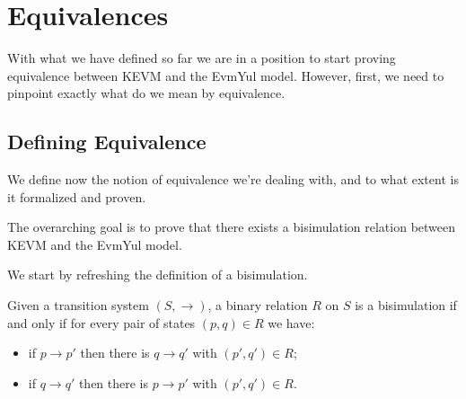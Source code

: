 \chapter{Equivalences}

With what we have defined so far we are in a position to start proving
equivalence between KEVM and the EvmYul model. However, first, we need to
pinpoint exactly what do we mean by equivalence.

\section{Defining Equivalence}

We define now the notion of equivalence we're dealing with, and to what extent
is it formalized and proven.

The overarching goal is to prove that there exists a bisimulation relation between
KEVM and the EvmYul model.

We start by refreshing the definition of a bisimulation.

\begin{definition}\label{def:bisimulation}
Given a transition system $(S, \rightarrow)$, a binary relation $R$ on $S$ is a
bisimulation if and only if for every pair of states $(p, q)\in R$ we have:
\begin{itemize}
\item if $p \rightarrow p'$ then there is $q \rightarrow q'$ with $(p', q') \in
  R$;
\item if $q \rightarrow q'$ then there is $p \rightarrow p'$ with $(p', q') \in
  R$.
\end{itemize}
\end{definition}


